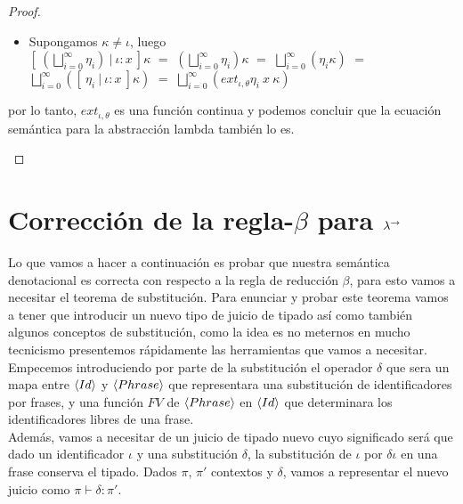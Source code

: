 \begin{proof}
\begin{itemize}
\begin{itemize}
\begin{itemize}
\item Supongamos $\kappa \neq \iota$, luego \\

$[ \ (\bigsqcup\limits^{\infty}_{i=0} \eta_i) \ | \ \iota:x \ ] \kappa$ $=$
$(\bigsqcup\limits^{\infty}_{i=0} \eta_i) \kappa$ $=$
$\bigsqcup\limits^{\infty}_{i=0} (\eta_i \kappa)$ $=$
$\bigsqcup\limits^{\infty}_{i=0} ([ \ \eta_i \ | \ \iota:x \ ] \kappa)$ $=$
$\bigsqcup\limits^{\infty}_{i=0} (ext_{\iota,\theta} \eta_i \ x \ \kappa)$\\
\end{itemize}

por lo tanto, $ext_{\iota,\theta}$ es una funci\'on continua y podemos concluir que
la ecuaci\'on sem\'antica para la abstracci\'on lambda tambi\'en lo es.
\end{itemize}
\end{itemize}
\end{proof}

\section{Correcci\'on de la regla-$\beta$ para $\lambda^{\rightarrow}$}

Lo que vamos a hacer a continuaci\'on es probar que nuestra sem\'antica 
denotacional es correcta con respecto a la regla de reducci\'on $\beta$, para esto
vamos a necesitar el teorema de substituci\'on. Para enunciar y probar este teorema
vamos a tener que introducir un nuevo tipo de juicio de tipado as\'i como tambi\'en
algunos conceptos de substituci\'on, como la idea es no meternos en mucho tecnicismo
presentemos r\'apidamente las herramientas que vamos a necesitar.\\

Empecemos introduciendo por parte de la substituci\'on el operador $\delta$ que 
sera un mapa entre $\langle Id \rangle$ y $\langle Phrase \rangle$ que representara una
substituci\'on de identificadores por frases, y una funci\'on
$FV$ de $\langle Phrase \rangle$ en $\langle Id \rangle$ que determinara los
identificadores libres de una frase.\\

Adem\'as, vamos a necesitar de un juicio de tipado nuevo cuyo significado
ser\'a que dado un identificador $\iota$ y una substituci\'on $\delta$, 
la substituci\'on de $\iota$ por $\delta\iota$ en una frase conserva el 
tipado. Dados $\pi$, $\pi'$ contextos y $\delta$, vamos a representar el 
nuevo juicio como $\pi \vdash \delta : \pi'$.

